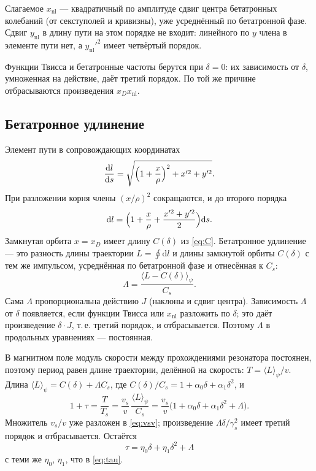 Слагаемое $x_{\mathrm{nl}}$ --- квадратичный по амплитуде сдвиг центра бетатронных колебаний (от секступолей и кривизны), уже усреднённый по бетатронной фазе. Сдвиг $y_{\mathrm{nl}}$ в длину пути на этом порядке не входит: линейного по $y$ члена в элементе пути нет, а $y_{\mathrm{nl}}'^2$ имеет четвёртый порядок.

Функции Твисса и бетатронные частоты берутся при $\delta=0$: их зависимость от $\delta$, умноженная на действие, даёт третий порядок. По той же причине отбрасываются произведения $x_D x_{\mathrm{nl}}$.

\subsection{Бетатронное удлинение}

Элемент пути в сопровождающих координатах
\begin{equation}
\label{eq:dl-exact}
\frac{\mathrm{d}l}{\mathrm{d}s}
=\sqrt{\Bigl(1+\frac{x}{\rho}\Bigr)^2+x'^2+y'^2}.
\end{equation}
При разложении корня члены $(x/\rho)^2$ сокращаются, и до второго порядка
\begin{equation}
\label{eq:dl}
\mathrm{d}l
=\Bigl(1+\frac{x}{\rho}+\frac{x'^2+y'^2}{2}\Bigr)\mathrm{d}s.
\end{equation}
Замкнутая орбита $x=x_D$ имеет длину $C(\delta)$ из \eqref{eq:C}. Бетатронное удлинение --- это разность длины траектории $L=\oint\mathrm{d}l$ и длины замкнутой орбиты $C(\delta)$ с тем же импульсом, усреднённая по бетатронной фазе и отнесённая к $C_s$:
\begin{equation}
\label{eq:Lambda}
\Lambda
=\frac{\langle L-C(\delta)\rangle_\psi}{C_s}.
\end{equation}
Сама $\Lambda$ пропорциональна действию $J$ (наклоны и сдвиг центра). Зависимость $\Lambda$ от $\delta$ появляется, если функции Твисса или $x_{\mathrm{nl}}$ разложить по $\delta$; это даёт произведение $\delta\cdot J$, т.\,е. третий порядок, и отбрасывается. Поэтому $\Lambda$ в продольных уравнениях --- постоянная.

В магнитном поле модуль скорости между прохождениями резонатора постоянен, поэтому период равен длине траектории, делённой на скорость: $T=\langle L\rangle_\psi/v$. Длина $\langle L\rangle_\psi=C(\delta)+\Lambda C_s$, где $C(\delta)/C_s=1+\alpha_0\delta+\alpha_1\delta^2$, и
\begin{equation*}
1+\tau=\frac{T}{T_s}=\frac{v_s}{v}\,\frac{\langle L\rangle_\psi}{C_s}
=\frac{v_s}{v}\bigl(1+\alpha_0\delta+\alpha_1\delta^2+\Lambda\bigr).
\end{equation*}
Множитель $v_s/v$ уже разложен в \eqref{eq:vsv}; произведение $\Lambda\delta/\gamma_s^2$ имеет третий порядок и отбрасывается. Остаётся
\begin{equation}
\label{eq:tau-L}
\tau=\eta_0\delta+\eta_1\delta^2+\Lambda
\end{equation}
с теми же $\eta_0$, $\eta_1$, что в \eqref{eq:tau}.

